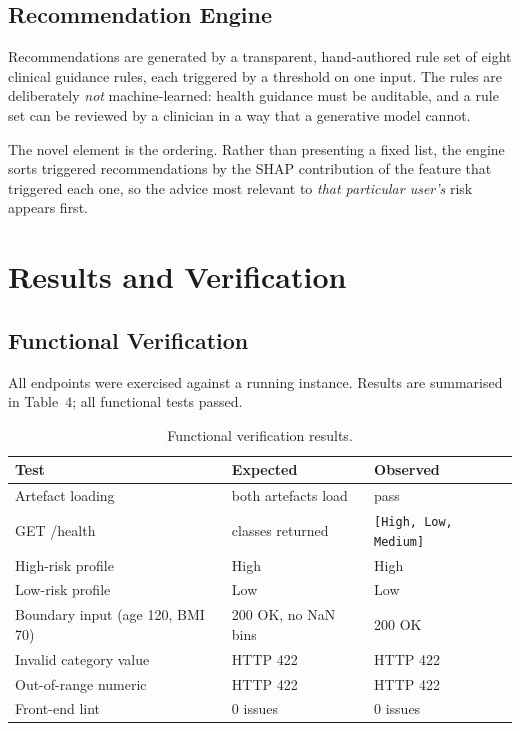 \documentclass[11pt,a4paper]{article}
\begin{document}
\subsection{Recommendation Engine}
Recommendations are generated by a transparent, hand-authored rule set of eight
clinical guidance rules, each triggered by a threshold on one input. The rules
are deliberately \emph{not} machine-learned: health guidance must be auditable,
and a rule set can be reviewed by a clinician in a way that a generative model
cannot.

The novel element is the ordering. Rather than presenting a fixed list, the
engine sorts triggered recommendations by the SHAP contribution of the feature
that triggered each one, so the advice most relevant to \emph{that particular
user's} risk appears first.

\section{Results and Verification}\label{sec:results}

\subsection{Functional Verification}
All endpoints were exercised against a running instance. Results are summarised
in Table~4; all functional tests passed.

\begin{table}[h!]
\centering\small
\begin{tabular}{@{}lll@{}}
\toprule
\textbf{Test} & \textbf{Expected} & \textbf{Observed} \\
\midrule
Artefact loading                & both artefacts load  & pass \\
GET /health                     & classes returned     & \texttt{[High, Low, Medium]} \\
High-risk profile               & High                 & High \\
Low-risk profile                & Low                  & Low \\
Boundary input (age 120, BMI 70)& 200 OK, no NaN bins  & 200 OK \\
Invalid category value          & HTTP 422             & HTTP 422 \\
Out-of-range numeric            & HTTP 422             & HTTP 422 \\
Front-end lint                  & 0 issues             & 0 issues \\
\bottomrule
\end{tabular}
\caption{Functional verification results.}
\end{table}
\end{document}
